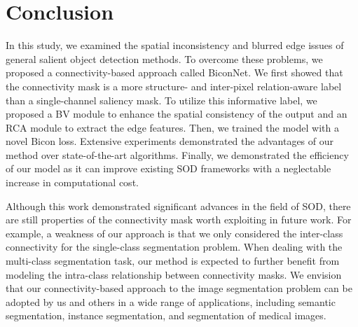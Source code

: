 \documentclass[review]{cvpr}
\begin{document}
\section{Conclusion}

In this study, we examined the spatial inconsistency and blurred edge issues of general salient object detection methods. To overcome these problems, we proposed a connectivity-based approach called BiconNet. We first showed that the connectivity mask is a more structure- and inter-pixel relation-aware label than a single-channel saliency mask. To utilize this informative label, we proposed a BV module to enhance the spatial consistency of the output and an RCA module to extract the edge features. Then, we trained the model with a novel Bicon loss. Extensive experiments demonstrated the advantages of our method over state-of-the-art algorithms. Finally, we demonstrated the efficiency of our model as it can improve existing SOD frameworks with a neglectable increase in computational cost.

Although this work demonstrated significant advances in the field of SOD, there are still properties of the connectivity mask worth exploiting in future work. For example, a weakness of our approach is that we only considered the inter-class connectivity for the single-class segmentation problem. When dealing with the multi-class segmentation task, our method is expected to further benefit from modeling the intra-class relationship between connectivity masks. We envision that our connectivity-based approach to the image segmentation problem can be adopted by us and others in a wide range of applications, including semantic segmentation, instance segmentation, and segmentation of medical images.








{\small


}
\end{document}
